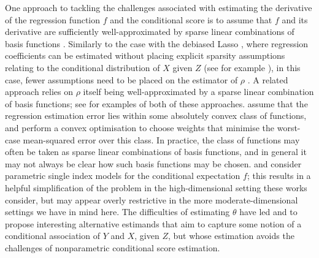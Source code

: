 \documentclass[aos]{imsart}
\begin{document}
	
	 One approach to tackling the challenges associated with estimating the derivative of the regression function $f$ and the conditional score is to assume that $f$ and its derivative are sufficiently well-approximated by sparse linear combinations of basis functions \citep{RothenhauslerICE, ChernozhukovRiesz}. Similarly to the case with the debiased Lasso \citep{ZhangDebiased}, where regression coefficients can be estimated without placing explicit sparsity assumptions relating to the conditional distribution of $X$ given $Z$ (see for example \citet{shah2023double}), in this case, fewer assumptions need to be placed on the estimator of $\rho$ \citet[Remark~4.1]{ChernozhukovRiesz}. A related approach relies on $\rho$ itself being well-approximated by a sparse linear combination of basis functions; see  \citet{chernozhukov2020adversarial, ChernozhukovAutoNet, ChernozhukovRobust,ChernozhukovAutoDML, ChernozhukovRiesz, ChernozhukovGeneral} for examples of both of these approaches.
		\cite{HirshbergMinimax} assume that the regression estimation error lies within some absolutely convex class of functions, and perform a  convex optimisation to choose weights that minimise the worst-case mean-squared error over this class. In practice, the class of functions may often be taken as sparse linear combinations of basis functions, and in general it may not always be clear how such basis functions may be chosen.
		\citet{HirshbergSingle} and \citet{wooldridge2020inference} consider parametric single index models for the conditional expectation $f$; this results in a helpful simplification of the problem in the high-dimensional setting these works consider, but may appear overly restrictive in the more moderate-dimensional settings we have in mind here.
		The difficulties of estimating $\theta$ have led \citet{VansteelandtLean} and \citet{hines2021parameterising} to propose interesting alternative estimands that aim to capture some notion of a conditional association of $Y$ and $X$, given $Z$, but whose estimation avoids the challenges of nonparametric conditional score estimation.
		
	
\end{document}
